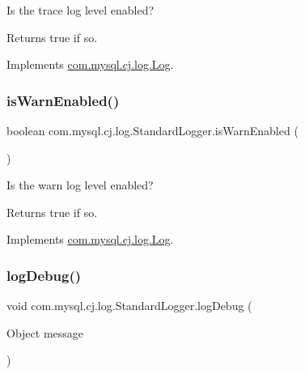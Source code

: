Is the \textquotesingle{}trace\textquotesingle{} log level enabled?

\begin{DoxyReturn}{Returns}
true if so. 
\end{DoxyReturn}


Implements \mbox{\hyperlink{interfacecom_1_1mysql_1_1cj_1_1log_1_1_log_a814070e176d987da656b45662bc63ccd}{com.\+mysql.\+cj.\+log.\+Log}}.

\mbox{\label{classcom_1_1mysql_1_1cj_1_1log_1_1_standard_logger_aad87d184634e72518bbc1a162fb06200}} 
\subsubsection{\texorpdfstring{is\+Warn\+Enabled()}{isWarnEnabled()}}
{\footnotesize\ttfamily boolean com.\+mysql.\+cj.\+log.\+Standard\+Logger.\+is\+Warn\+Enabled (\begin{DoxyParamCaption}{ }\end{DoxyParamCaption})}

Is the \textquotesingle{}warn\textquotesingle{} log level enabled?

\begin{DoxyReturn}{Returns}
true if so. 
\end{DoxyReturn}


Implements \mbox{\hyperlink{interfacecom_1_1mysql_1_1cj_1_1log_1_1_log_a7877db04f22a78b801a8f2f8989d7043}{com.\+mysql.\+cj.\+log.\+Log}}.

\mbox{\label{classcom_1_1mysql_1_1cj_1_1log_1_1_standard_logger_a99571fed95c82bb8356f213c3a4b0fa8}} 
\subsubsection{\texorpdfstring{log\+Debug()}{logDebug()}\hspace{0.1cm}{\footnotesize\ttfamily [1/2]}}
{\footnotesize\ttfamily void com.\+mysql.\+cj.\+log.\+Standard\+Logger.\+log\+Debug (\begin{DoxyParamCaption}\item[{Object}]{message }\end{DoxyParamCaption})}

